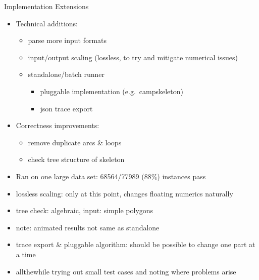 \documentclass[
  size=9pt,
  style=jefka,
  paper=screen,
  mode=print,
  display=slides,
  nohandoutpagebreaks,
  pauseslide,
  hlsections,
  fleqn,
  dvips,
  clock
]{powerdot}
\begin{document}
\begin{slide}{Implementation Extensions}
  \begin{itemize}
    \item Technical additions:
    \begin{itemize}
      \item parse more input formats
      \item input/output scaling (lossless, to try and mitigate numerical issues)
      \item standalone/batch runner
      \begin{itemize}
        \item pluggable implementation (e.g.\ campskeleton)
        \item json trace export
      \end{itemize}
    \end{itemize}

    \item Correctness improvements:
    \begin{itemize}
      \item remove duplicate arcs \& loops
      \item check tree structure of skeleton
    \end{itemize}

    \item Ran on one large data set: 68564/77989 ($88\%$) instances pass
  \end{itemize}
\end{slide}
\begin{note}{}
  \begin{itemize}
    \item lossless scaling: only at this point, changes floating numerics naturally
    \item tree check: algebraic, input: simple polygons
    \item note: animated results not same as standalone
    \item trace export \& pluggable algorithm: should be possible to change one part at a time
    \item allthewhile trying out small test cases and noting where problems arise
  \end{itemize}
\end{note}
\end{document}
